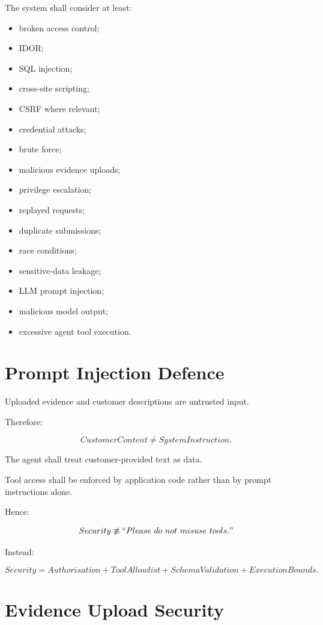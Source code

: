 \documentclass[11pt,a4paper]{article}
\begin{document}
The system shall consider at least:

\begin{itemize}
    \item broken access control;
    \item IDOR;
    \item SQL injection;
    \item cross-site scripting;
    \item CSRF where relevant;
    \item credential attacks;
    \item brute force;
    \item malicious evidence uploads;
    \item privilege escalation;
    \item replayed requests;
    \item duplicate submissions;
    \item race conditions;
    \item sensitive-data leakage;
    \item LLM prompt injection;
    \item malicious model output;
    \item excessive agent tool execution.
\end{itemize}

\section{Prompt Injection Defence}

Uploaded evidence and customer descriptions are untrusted input.

Therefore:

\[
CustomerContent
\neq
SystemInstruction.
\]

The agent shall treat customer-provided text as data.

Tool access shall be enforced by application code rather than by
prompt instructions alone.

Hence:

\[
Security
\not\equiv
``Please\ do\ not\ misuse\ tools."
\]

Instead:

\[
Security
=
Authorisation
+
ToolAllowlist
+
SchemaValidation
+
ExecutionBounds.
\]

\section{Evidence Upload Security}
\end{document}
